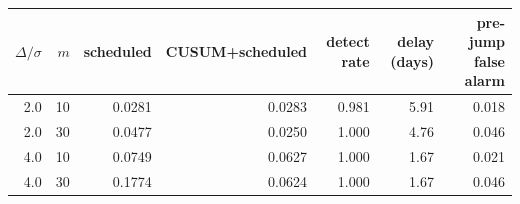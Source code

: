\begin{tabular}{rrrrrrr}
\toprule
$\Delta/\sigma$ & $m$ & scheduled & CUSUM+scheduled & detect rate & delay (days) & pre-jump false alarm \\
\midrule
2.0 & 10 & 0.0281 & 0.0283 & 0.981 & 5.91 & 0.018 \\
2.0 & 30 & 0.0477 & 0.0250 & 1.000 & 4.76 & 0.046 \\
4.0 & 10 & 0.0749 & 0.0627 & 1.000 & 1.67 & 0.021 \\
4.0 & 30 & 0.1774 & 0.0624 & 1.000 & 1.67 & 0.046 \\
\bottomrule
\end{tabular}
